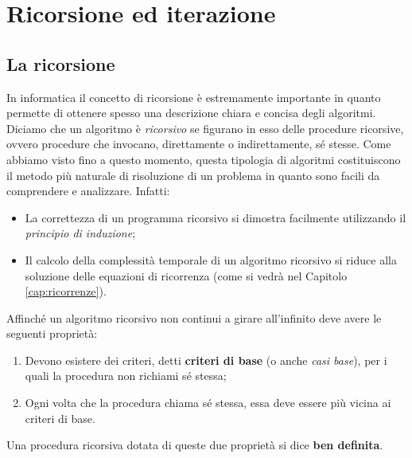 \chapter{Ricorsione ed iterazione}\label{cap:ricorsione}
\section{La ricorsione}
In informatica il concetto di ricorsione è estremamente importante in quanto permette di ottenere spesso una descrizione chiara e concisa degli algoritmi. Diciamo che un algoritmo è \textit{ricorsivo} se figurano in esso delle procedure ricorsive, ovvero procedure che invocano, direttamente o indirettamente, sé stesse. Come abbiamo visto fino a questo momento, questa tipologia di algoritmi costituiscono il metodo più naturale di risoluzione di un problema in quanto sono facili da comprendere e analizzare. Infatti:
\begin{itemize}
	\item La correttezza di un programma ricorsivo si dimostra facilmente utilizzando il \textit{principio di induzione};
	\item Il calcolo della complessità temporale di un algoritmo ricorsivo si riduce alla soluzione delle equazioni di ricorrenza (come si vedrà nel Capitolo \ref{cap:ricorrenze}).
\end{itemize}
Affinché un algoritmo ricorsivo non continui a girare all'infinito deve avere le seguenti proprietà:
\begin{enumerate}
	\item Devono esistere dei criteri, detti \textbf{criteri di base} (o anche \textit{casi base}), per i quali la procedura non richiami sé stessa;
	\item Ogni volta che la procedura chiama sé stessa, essa deve essere più vicina ai criteri di base.
\end{enumerate}
Una procedura ricorsiva dotata di queste due proprietà si dice \textbf{ben definita}.


